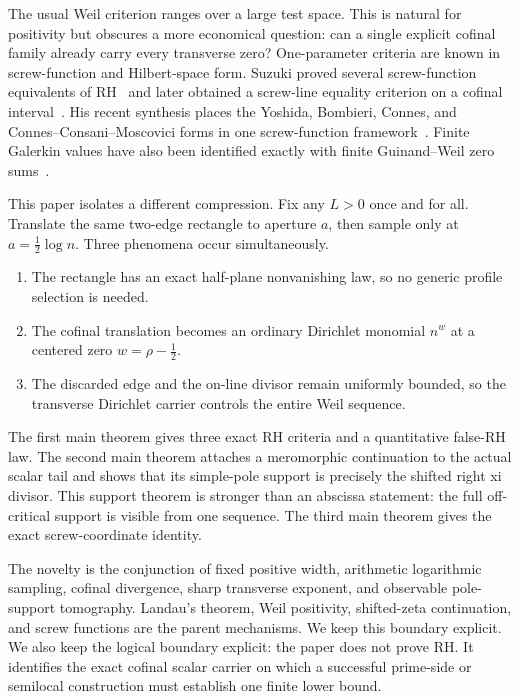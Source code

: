 \documentclass[11pt]{article}
\begin{document}
The usual Weil criterion ranges over a large test space.  This is natural for positivity but
obscures a more economical question: can a single explicit cofinal family already carry every
transverse zero?  One-parameter criteria are known in screw-function and Hilbert-space form.
Suzuki proved several screw-function equivalents of RH~\cite{Suzuki2023} and later obtained a
screw-line equality criterion on a cofinal interval~\cite{Suzuki2025}.  His recent synthesis
places the Yoshida, Bombieri, Connes, and Connes--Consani--Moscovici forms in one screw-function
framework~\cite{Suzuki2026}.  Finite Galerkin values have also been identified exactly with
finite Guinand--Weil zero sums~\cite{Groskin2026}.

This paper isolates a different compression.  Fix any $L>0$ once and for all.  Translate the
same two-edge rectangle to aperture $a$, then sample only at $a=\frac12\log n$.  Three phenomena
occur simultaneously.

\begin{enumerate}[label=(\roman*)]
\item The rectangle has an exact half-plane nonvanishing law, so no generic profile selection is
needed.
\item The cofinal translation becomes an ordinary Dirichlet monomial $n^w$ at a centered zero
$w=\rho-\frac12$.
\item The discarded edge and the on-line divisor remain uniformly bounded, so the transverse
Dirichlet carrier controls the entire Weil sequence.
\end{enumerate}

The first main theorem gives three exact RH criteria and a quantitative false-RH law.  The second
main theorem attaches a meromorphic continuation to the actual scalar tail and shows that its
simple-pole support is precisely the shifted right xi divisor.  This support theorem is stronger
than an abscissa statement: the full off-critical support is visible from one sequence.  The third
main theorem gives the exact screw-coordinate identity.

The novelty is the conjunction of fixed positive width, arithmetic logarithmic sampling,
cofinal divergence, sharp transverse exponent, and observable pole-support tomography.  Landau's
theorem, Weil positivity, shifted-zeta continuation, and screw functions are the parent
mechanisms.  We keep this boundary explicit.  We also keep the logical boundary explicit: the
paper does not prove RH.  It identifies the exact cofinal scalar carrier on which a successful
prime-side or semilocal construction must establish one finite lower bound.
\end{document}

